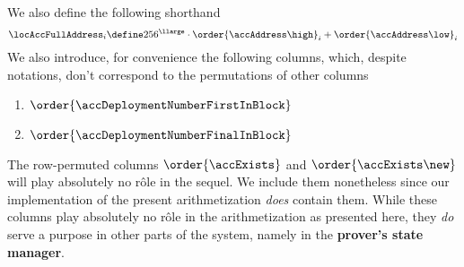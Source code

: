 We also define the following shorthand
\[
	\locAccFullAddress_{i}
	\define
	256^\llarge \cdot \order{\accAddress\high}_{i} + \order{\accAddress\low}_{i}
\]
We also introduce, for convenience the following columns, which, despite notations, don't correspond to the permutations of other columns
\begin{multicols}{2}
	\begin{enumerate}
		\item $\order{\accDeploymentNumberFirstInBlock}$
		\item $\order{\accDeploymentNumberFinalInBlock}$
	\end{enumerate}
\end{multicols}
\saNote{}
The row-permuted columns
$\order{\accExists}$ and
$\order{\accExists\new}$
will play absolutely no rôle in the sequel.
We include them nonetheless since our implementation of the present arithmetization \emph{does} contain them.
While these columns play absolutely no rôle in the arithmetization as presented here,
they \emph{do} serve a purpose in other parts of the system, namely in the \textbf{prover's state manager}.
